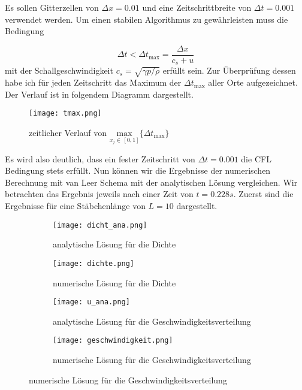 \documentclass[12pt]{article}
\begin{document}
Es sollen Gitterzellen von $\Delta{x}=0.01$ und eine Zeitschrittbreite von $\Delta{t}=0.001$ verwendet werden. Um einen stabilen Algorithmus zu gewährleisten muss die Bedingung

$$\Delta{t}<\Delta{t}_\text{max}=\frac{\Delta{x}}{c_s+u}$$ 
mit der Schallgeschwindigkeit $c_s=\sqrt{\gamma{p}/\rho}$ erfüllt sein. Zur Überprüfung dessen habe ich für jeden Zeitschritt das Maximum der $\Delta{t}_\text{max}$ aller Orte aufgezeichnet. Der Verlauf ist in folgendem Diagramm dargestellt.
\begin{figure}[H]\centering\texttt{[image: tmax.png]}\caption{zeitlicher Verlauf von $\underset{x_j\in\,[0,1]}{\text{max}}\{\Delta{t}_\text{max}\}$}\end{figure}

Es wird also deutlich, dass ein fester Zeitschritt von $\Delta{t}=0.001$ die CFL Bedingung stets erfüllt. \newline\newline
Nun können wir die Ergebnisse der numerischen Berechnung mit van Leer Schema mit der analytischen Lösung vergleichen. Wir betrachten das Ergebnis jeweils nach einer Zeit von $t=0.228s$. Zuerst sind die Ergebnisse für eine Stäbchenlänge von $L=10$ dargestellt.

\begin{figure}[H]\hspace*{-1.5cm}
\begin{subfigure}{0.4\textwidth}
\texttt{[image: dicht\_ana.png]}
\caption{analytische Lösung für die Dichte}
\end{subfigure}
\hfill
\begin{subfigure}{0.4\textwidth}
\hspace*{-0.8cm}
\texttt{[image: dichte.png]}
\caption{numerische Lösung für die Dichte}
\end{subfigure}
\hfill
\hspace*{-1.5cm}
\begin{subfigure}{0.4\textwidth}
\texttt{[image: u\_ana.png]}
\caption{analytische Lösung für die Geschwindigkeitsverteilung}
\end{subfigure}
\hfill
\begin{subfigure}{0.4\textwidth}
\hspace*{-0.8cm}
\texttt{[image: geschwindigkeit.png]}
\caption{numerische Lösung für die Geschwindigkeitsverteilung}
\end{subfigure}
\hfill
\end{figure}
\end{document}
